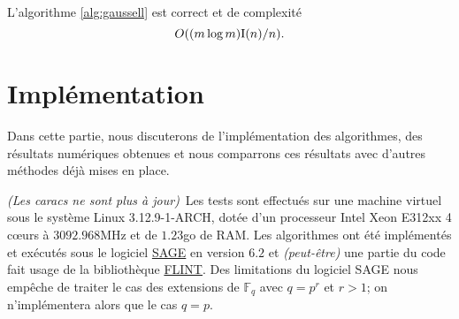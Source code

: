 \documentclass[a4paper]{article} %
\numberwithin{section}{part}
\numberwithin{equation}{section}
\newcommand\GF[1]{\mathbb{F}_{#1}}
\newcommand\I[1]{\textup{I}(#1)}
\begin{document}
\begin{prop}
L'algorithme \ref{alg:gaussell} est correct et de complexité 
\begin{equation}
O((m\,\textup{log\,}m)\I{n}/n).
\end{equation}
\end{prop}


\part{Implémentation}
\label{trois}
Dans cette partie, nous discuterons de l'implémentation des algorithmes, des
résultats numériques obtenues et nous comparrons ces résultats avec d'autres
méthodes déjà mises en place.\par
\emph{(Les caracs ne sont plus à jour)}\,
Les tests sont effectués sur une machine virtuel sous le système Linux 
3.12.9-1-ARCH, dotée d'un processeur Intel Xeon E312xx 4 c\oe urs à 
$3092.968$MHz et de $1.23$go de RAM. Les algorithmes ont été implémentés et 
exécutés sous le logiciel \href{http://www.sagemath.org/}{SAGE} en version 
$6.2$ et \emph{(peut-être)} une partie du code fait usage de la bibliothèque
\href{http://www.flintlib.org/}{FLINT}. Des limitations du logiciel SAGE nous
empêche de traiter le cas des extensions de $\GF{q}$ avec $q = p^r$ et $r>1$; on
n'implémentera alors que le cas $q = p$.
\end{document}
